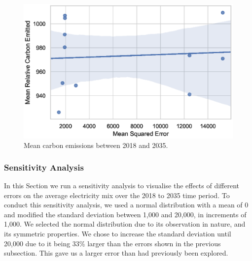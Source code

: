 \documentclass[final,3p,times,twocolumn,numbers]{elsarticle}
\begin{document}
\begin{figure}
\centering
\includegraphics[width=0.7\columnwidth]{figures/results/elecsim_results/results_2/Carbon_emitted_mean_output.eps}
\caption{Mean carbon emissions between 2018 and 2035.}
\label{fig:Carbon_emitted_mean_output}
\end{figure}





%
%
%
%
%




\subsubsection{Sensitivity Analysis}

In this Section we run a sensitivity analysis to visualise the effects of different errors on the average electricity mix over the 2018 to 2035 time period. To conduct this sensitivity analysis, we used a normal distribution with a mean of 0 and modified the standard deviation between 1,000 and 20,000, in increments of 1,000. We selected the normal distribution due to its observation in nature, and its symmetric properties. We chose to increase the standard deviation until 20,000 due to it being 33\% larger than the errors shown in the previous subsection. This gave us a larger error than had previously been explored.
\end{document}

